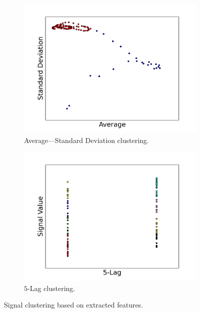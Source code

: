 \documentclass[11pt, letterpaper]{article}            %
\begin{document}
\begin{figure}[htbp]
  \begin{subfigure}[b]{0.49\textwidth}
    \includegraphics[width=\textwidth]{./gfx/f1f2.png}
    \caption{Average---Standard Deviation clustering.\label{fig:Cavgstd}}
  \end{subfigure}
  \hfill
  \begin{subfigure}[b]{0.49\textwidth}
    \includegraphics[width=\textwidth]{./gfx/f4f5.png}
    \caption{$5$-Lag clustering.\label{fig:Clag}}
  \end{subfigure}

  \caption{Signal clustering based on extracted features.\label{fig:clustering}}
\end{figure}
\end{document}
